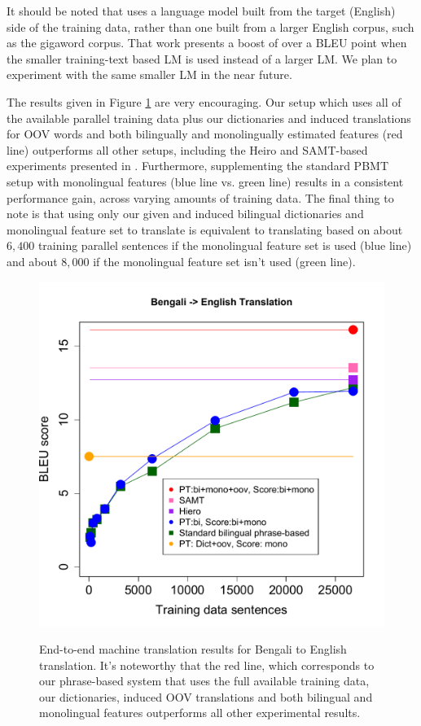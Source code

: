 \documentclass[11pt]{article}
\begin{document}
It should be noted that  uses a language model built from the target (English) side of the training data, rather than one built from a larger English corpus, such as the gigaword corpus. That work presents a boost of over a BLEU point when the smaller training-text based LM is used instead of a larger LM. We plan to experiment with the same smaller LM in the near future.

The results given in Figure \ref{fig:bntrans} are very encouraging. Our setup which uses all of the available parallel training data plus our dictionaries and induced translations for OOV words and both bilingually and monolingually estimated features (red line) outperforms all other setups, including the Heiro and SAMT-based experiments presented in . Furthermore, supplementing the standard PBMT setup with monolingual features (blue line vs. green line) results in a consistent performance gain, across varying amounts of training data. The final thing to note is that using only our given and induced bilingual dictionaries and monolingual feature set to translate is equivalent to translating based on about $6,400$ training parallel sentences if the monolingual feature set is used (blue line) and about $8,000$ if the monolingual feature set isn't used (green line).

\begin{figure}
\vskip 0.0in
\begin{center}
\includegraphics[width=1.05 \linewidth]{Figures/bntranslate.pdf}
\vskip -0.15in
\caption{End-to-end machine translation results for Bengali to English translation. It's noteworthy that the red line, which corresponds to our phrase-based system that uses the full available training data, our dictionaries, induced OOV translations and both bilingual and monolingual features outperforms all other experimental results.}
\vskip -0.2in
\label{fig:bntrans} 
\end{center}
\end{figure}
\end{document}
